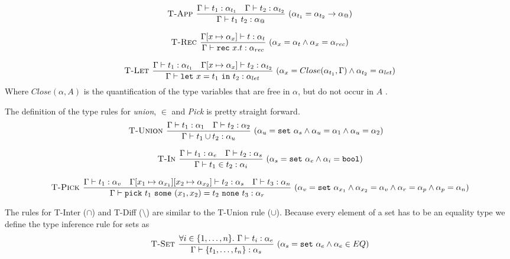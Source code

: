 \documentclass[a4paper]{article}
\newcommand{\s}[1]{\mathtt{#1}}
\newcommand{\sLb}{\s{\{}}
\newcommand{\sRb}{\s{\}}}
\newcommand{\sseta}{\s{set\ }}
\newcommand{\spick}[3]{\s{pick}\ #1\ \s{some}\ #2\ \s{none}\ #3}
\newcommand{\sletin}[2]{\s{let\ } #1 \s{\ in\ } #2}
\newcommand{\srec}{\s{rec\ }}
\newcommand{\sset}[1]{\sLb #1 \sRb}
\newcommand{\dotset}[2]{\{#1,\ldots,#2\}}
\renewcommand{\rule}[3][]{\ \mbox{\textsc{#1 }}\dfrac{#2}{#3}\ }
\begin{document}
\[\begin{array}{c}
\rule[T-App]{\Gamma\vdash t_1 : \alpha_{t_1} \quad \Gamma \vdash t_2 : \alpha_{t_2}}{\Gamma \vdash t_1\ t_2 : \alpha_@} (\alpha_{t_1} = \alpha_{t_2} \to \alpha_@)
\\\\
\rule[T-Rec]{\Gamma[x \mapsto \alpha_x] \vdash t : \alpha_t}
{\Gamma\vdash \srec x. t : \alpha_{rec}} (\alpha_x = \alpha_t \wedge \alpha_x = \alpha_{rec})
\\\\
\rule[T-Let]{\Gamma \vdash t_1 : \alpha_{t_1}
\quad \Gamma[x \mapsto \alpha_x] \vdash t_2 : \alpha_{t_2}}
{\Gamma\vdash \sletin{x = t_1}{t_2} : \alpha_{let}} (\alpha_x = Close(\alpha_{t_1},\Gamma) \wedge \alpha_{t_2} = \alpha_{let})
\end{array}\]
Where $Close (\alpha, A)$ is the quantification of the type variables that are free in $\alpha$, but do not occur in $A$ \cite{Heeren02generalizinghindley-milner}.

The definition of the type rules for \emph{union}, $\in$ and \emph{Pick} is pretty straight forward.
\[\begin{array}{c}
\rule[T-Union]{\Gamma\vdash t_1 : \alpha_1
\quad \Gamma \vdash t_2 : \alpha_2}
{\Gamma \vdash t_1 \cup t_2 : \alpha_u}
(\alpha_u = \sseta \alpha_s \wedge \alpha_u = \alpha_1 \wedge \alpha_u = \alpha_2)
\quad
\\\\
\rule[T-In]{\Gamma\vdash t_1 : \alpha_e
\quad \Gamma \vdash t_2 : \alpha_s}
{\Gamma \vdash t_1 \in t_2 : \alpha_i}
(\alpha_s = \sseta \alpha_e \wedge \alpha_i = \s{bool})
\\\\
\rule[T-Pick]{\Gamma \vdash t_1 : \alpha_v
\quad \Gamma[x_1 \mapsto \alpha_{x_1}][x_2 \mapsto \alpha_{x_2}]
\vdash t_2 : \alpha_s
\quad \Gamma \vdash t_3 : \alpha_n}
{\Gamma\vdash \spick{t_1}{(x_1,x_2) = t_2}{t_3} : \alpha_r}
(\alpha_v = \sseta \alpha_{x_1} \wedge \alpha_{x_2} = \alpha_v
\wedge \alpha_r = \alpha_p \wedge \alpha_p = \alpha_n)
\end{array}
\]

The rules for T-Inter ($\cap$) and T-Diff ($\setminus$) are similar
to the T-Union rule ($\cup$).
Because every element of a set has to be an equality type we define the type inference rule for sets as
\[
\rule[T-Set]{\forall i\in \dotset{1}{n}.\ \Gamma\vdash t_i : \alpha_e}
{\Gamma\vdash\sset{t_1,\ldots,t_n} : \alpha_s}
(\alpha_s = \sseta \alpha_e \wedge \alpha_e \in EQ)
\]
\end{document}
